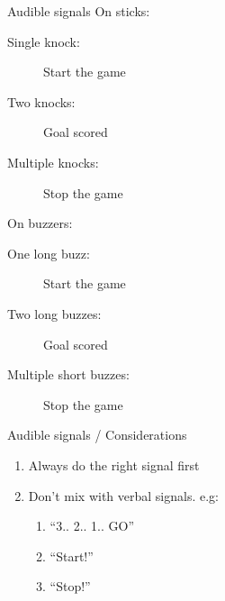 \begin{frame}{Audible signals}
    On sticks:

    \begin{center}
        \begin{description}
            \item[Single knock:] Start the game
            \item[Two knocks:] Goal scored
            \item[Multiple knocks:] Stop the game
        \end{description}
    \end{center}

    On buzzers:

    \begin{center}
        \begin{description}
            \item[One long buzz:] Start the game
            \item[Two long buzzes:] Goal scored
            \item[Multiple short buzzes:] Stop the game
        \end{description}
    \end{center}
\end{frame}

\begin{frame}{Audible signals / Considerations}
    \begin{enumerate}
        \item Always do the right signal first
        \item Don't mix with verbal signals. e.g:
              \begin{enumerate}
                  \item ``3.. 2.. 1.. GO''
                  \item ``Start!''
                  \item ``Stop!''
              \end{enumerate}
    \end{enumerate}
\end{frame}